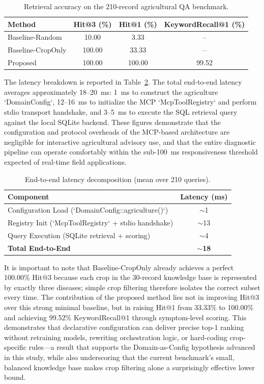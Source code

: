 \begin{table}[htbp]
\centering
\caption{Retrieval accuracy on the 210-record agricultural QA benchmark.}
\label{tab:retrieval_results}
\begin{tabular}{lccc}
\hline
\textbf{Method} & \textbf{Hit@3 (\%)} & \textbf{Hit@1 (\%)} & \textbf{KeywordRecall@1 (\%)} \\
\hline
Baseline-Random    & 10.00  & 3.33   & --     \\
Baseline-CropOnly  & 100.00 & 33.33  & --     \\
Proposed           & 100.00 & 100.00 & 99.52  \\
\hline
\end{tabular}
\end{table}

The latency breakdown is reported in Table~\ref{tab:latency_results}. The total end-to-end latency averages approximately 18--20~ms: 1~ms to construct the agriculture `DomainConfig`, 12--16~ms to initialize the MCP `McpToolRegistry` and perform stdio transport handshake, and 3--5~ms to execute the SQL retrieval query against the local SQLite backend. These figures demonstrate that the configuration and protocol overheads of the MCP-based architecture are negligible for interactive agricultural advisory use, and that the entire diagnostic pipeline can operate comfortably within the sub-100~ms responsiveness threshold expected of real-time field applications.

\begin{table}[htbp]
\centering
\caption{End-to-end latency decomposition (mean over 210 queries).}
\label{tab:latency_results}
\begin{tabular}{lc}
\hline
\textbf{Component} & \textbf{Latency (ms)} \\
\hline
Configuration Load (`DomainConfig::agriculture()`) & $\sim$1 \\
Registry Init (`McpToolRegistry` + stdio handshake) & $\sim$13 \\
Query Execution (SQLite retrieval + scoring)         & $\sim$4 \\
\hline
\textbf{Total End-to-End}                           & \textbf{$\sim$18} \\
\hline
\end{tabular}
\end{table}

It is important to note that Baseline-CropOnly already achieves a perfect 100.00\% Hit@3 because each crop in the 30-record knowledge base is represented by exactly three diseases; simple crop filtering therefore isolates the correct subset every time. The contribution of the proposed method lies not in improving Hit@3 over this strong minimal baseline, but in raising Hit@1 from 33.33\% to 100.00\% and achieving 99.52\% KeywordRecall@1 through symptom-level scoring. This demonstrates that declarative configuration can deliver precise top-1 ranking without retraining models, rewriting orchestration logic, or hard-coding crop-specific rules---a result that supports the Domain-as-Config hypothesis advanced in this study, while also underscoring that the current benchmark's small, balanced knowledge base makes crop filtering alone a surprisingly effective lower bound.

